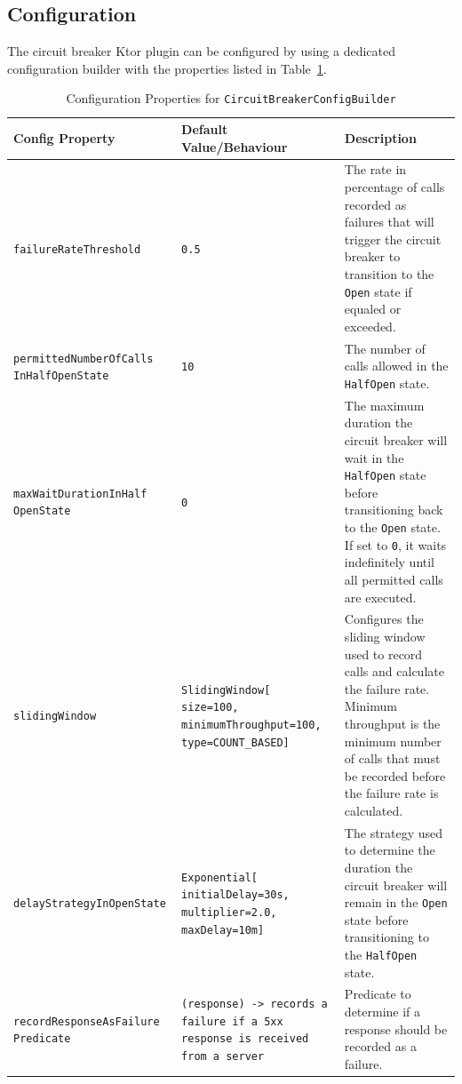 \subsection{Configuration}\label{subsec:cbreaker-configuration}

The circuit breaker Ktor plugin can be configured
by using a dedicated configuration builder with the properties listed in Table~\ref{tab:circuit-breaker-config-builder}.

\begin{table}[!htb]
    \centering
    \caption{Configuration Properties for \texttt{CircuitBreakerConfigBuilder}}
    \label{tab:circuit-breaker-config-builder}
    \vspace{0.3cm}
    \begin{tabular}{|p{5cm}|p{5cm}|p{6cm}|}
        \hline
        \textbf{Config Property}                   & \textbf{Default Value/Behaviour}                                                     & \textbf{Description}                                                                                                                                        \\ \hline
        \texttt{failureRateThreshold}              & \texttt{0.5}                                                                         & The rate in percentage of calls recorded as failures that will trigger the circuit breaker to transition to the \texttt{Open} state if equaled or exceeded. \\ \hline
        \texttt{permittedNumberOfCalls InHalfOpenState} & \texttt{10} & The number of calls
        allowed in the \texttt{HalfOpen} state. \\ \hline
        \texttt{maxWaitDurationInHalf OpenState} & \texttt{0} & The maximum duration
        the circuit breaker will wait in the \texttt{HalfOpen} state before transitioning back to the \texttt{Open} state.
        If set to \texttt{0}, it waits indefinitely until all permitted calls are executed. \\ \hline
        \texttt{slidingWindow} & \texttt{SlidingWindow[ size=100, minimumThroughput=100, type=COUNT\_BASED]}
        & Configures the sliding window used to record calls and calculate the failure rate.
        Minimum throughput is the minimum number of calls
        that must be recorded before the failure rate is calculated.
        \\ \hline
        \texttt{delayStrategyInOpenState}          & \texttt{Exponential[ initialDelay=30s, multiplier=2.0, maxDelay=10m]}     & The strategy used to determine the duration the circuit breaker will remain in the \texttt{Open} state before transitioning to the \texttt{HalfOpen} state. \\ \hline
        \texttt{recordResponseAsFailure Predicate} & \texttt{(response) -> records a failure if a 5xx response is received from a server}                               & Predicate to determine if a response should be recorded as a failure.                                   \\ \hline
    \end{tabular}
\end{table}

